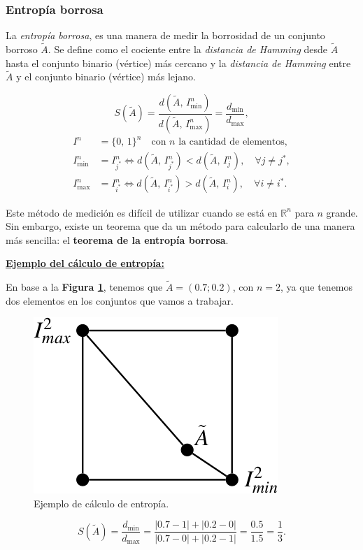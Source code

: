\documentclass[10pt,a4paper]{article}
\begin{document}
\subsubsection{Entropía borrosa}

La \textit{entropía borrosa}, es una manera de medir la borrosidad de un conjunto borroso $\tilde{A}$. Se define como el cociente entre la \textit{distancia de Hamming} desde $\tilde{A}$ hasta el conjunto binario (vértice) más cercano y la \textit{distancia de Hamming} entre $\tilde{A}$ y el conjunto binario (vértice) más lejano.

\begin{multicols}{2}
\[
S(\tilde{A}) = \frac{d(\tilde{A}, \,I_{\min}^n)}{d(\tilde{A}, \,I_{\max}^n)} 
= \frac{d_{\min}}{d_{\max}},
\]
\columnbreak
\begin{align*}
I^n &= \{0,\,1\}^n \quad \text{con $n$ la cantidad de elementos}, \\
I_{\min}^n &= I_{j^*}^n \iff d(\tilde{A}, \, I_{j^*}^n) < d(\tilde{A},\,I_j^n), \quad \forall j\neq j^*, \\
I_{\max}^n &= I_{i^*}^n \iff d(\tilde{A}, \, I_{i^*}^n) > d(\tilde{A},\,I_i^n), \quad \forall i\neq i^*.
\end{align*}
\end{multicols}

Este método de medición es difícil de utilizar cuando se está en $\mathbb{R}^n$ para $n$ grande. Sin embargo, existe un teorema que da un método para calcularlo de una manera más sencilla: el \textbf{teorema de la entropía borrosa}.

\underline{\textbf{Ejemplo del cálculo de entropía:}}

En base a la \textbf{Figura \ref{fig:ejemplo_entropia}}, tenemos que $\tilde{A}=(0.7 ; 0.2)$, con $n=2$, ya que tenemos dos elementos en los conjuntos que vamos a trabajar.

\begin{figure}
  \caption{Ejemplo de cálculo de entropía.}
  \label{fig:ejemplo_entropia}
  \centerline{\includegraphics[width=0.25\textwidth-\fboxrule-\fboxrule]{imgs/ejemplo_entropia.png}}
\end{figure}

\[
S(\tilde{A}) = 
\frac{d_{\min}}{d_{\max}} =
\frac{|0.7 - 1| + |0.2 - 0|}
{|0.7 - 0| + |0.2 - 1|}
= \frac{0.5}{1.5} = \frac{1}{3}.
\]
\end{document}
